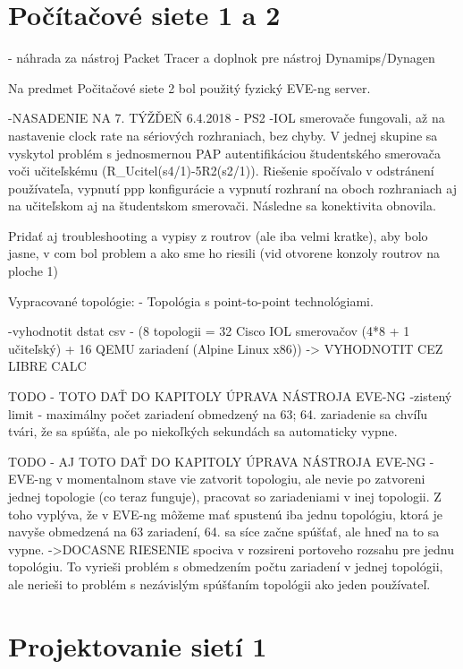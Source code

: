 \section{Počítačové siete 1 a 2}

- náhrada za nástroj Packet Tracer a doplnok pre nástroj Dynamips/Dynagen

Na predmet Počitačové siete 2 bol použitý fyzický EVE-ng server.

-NASADENIE NA 7. TÝŽĎEŇ 6.4.2018 - PS2
      -IOL smerovače fungovali, až na nastavenie clock rate na sériových rozhraniach, bez chyby. V jednej skupine sa vyskytol problém s jednosmernou PAP autentifikáciou študentského smerovača voči učiteľskému (R\_Ucitel(s4/1)-5R2(s2/1)). Riešenie spočívalo v odstránení používateľa, vypnutí ppp konfigurácie a vypnutí rozhraní na oboch rozhraniach aj na učiteľskom aj na študentskom smerovači. Následne sa konektivita obnovila.

  Pridať aj troubleshooting a vypisy z routrov (ale iba velmi kratke), aby bolo jasne, v com bol problem a ako sme ho riesili (vid otvorene konzoly routrov na ploche 1)

Vypracované topológie:
- Topológia s point-to-point technológiami.

-vyhodnotit dstat csv - (8 topologii = 32 Cisco IOL smerovačov (4*8 + 1 učiteľský) + 16 QEMU zariadení (Alpine Linux x86))
        -> VYHODNOTIT CEZ LIBRE CALC
        
    
    
{\huge TODO - TOTO DAŤ DO KAPITOLY ÚPRAVA NÁSTROJA EVE-NG}
-zistený limit - maximálny počet zariadení obmedzený na 63; 64. zariadenie sa chvíľu tvári, že sa spúšťa, ale po niekoľkých sekundách sa automaticky vypne.

{\huge TODO - AJ TOTO DAŤ DO KAPITOLY ÚPRAVA NÁSTROJA EVE-NG}
-EVE-ng v momentalnom stave vie zatvorit topologiu, ale nevie po zatvoreni jednej topologie (co teraz funguje), pracovat so zariadeniami v inej topologii. Z toho vyplýva, že v EVE-ng môžeme mať spustenú iba jednu topológiu, ktorá je navyše obmedzená na 63 zariadení, 64. sa síce začne spúšťať, ale hneď na to sa vypne.
    ->DOCASNE RIESENIE spociva v rozsireni portoveho rozsahu pre jednu topológiu. To vyrieši problém s obmedzením počtu zariadení v jednej topológii, ale nerieši to problém s nezávislým spúšťaním topológii ako jeden používateľ.



\section{Projektovanie sietí 1}

